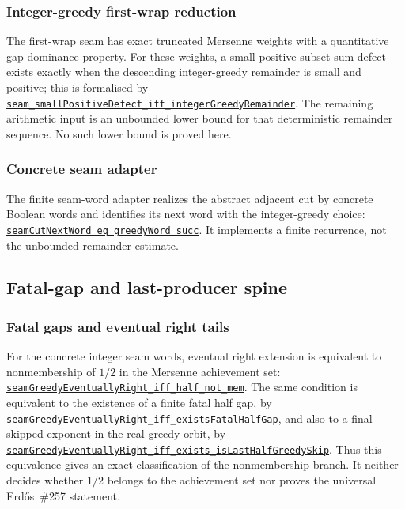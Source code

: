\documentclass[11pt]{article}
\newcommand{\commit}{81150c1c6fdd4cd51e76d3aa0de344341e0e9e7c}
\newcommand{\repobase}{https://github.com/wcook04/plectis-lean-erdos249-257/blob/\commit}
\newcommand{\PK}{Erdos249257}
\newcommand{\lref}[3]{\href{\repobase/\PK/#1\#L#2}{\nolinkurl{#3}}}
\newcommand{\lrefx}[3]{\href{\repobase/\PK/#1\#L#2}{\nolinkurl{#3}}}
\theoremstyle{definition}
\theoremstyle{remark}
\begin{document}
\subsubsection{Integer-greedy first-wrap reduction}\label{res:integergreedy}

The first-wrap seam has exact truncated Mersenne weights with a quantitative
gap-dominance property.  For these weights, a small positive subset-sum defect
exists exactly when the descending integer-greedy remainder is small and
positive; this is formalised by
\lref{HalfCylinderIntegerGreedy.lean}{654}{seam_smallPositiveDefect_iff_integerGreedyRemainder}.
The remaining arithmetic input is an unbounded lower bound for that
deterministic remainder sequence.  No such lower bound is proved here.

\subsubsection{Concrete seam adapter}\label{res:concreteseam}

The finite seam-word adapter realizes the abstract adjacent cut by concrete
Boolean words and identifies its next word with the integer-greedy choice:
\lref{HalfCylinderConcreteSeamAdapter.lean}{667}{seamCutNextWord_eq_greedyWord_succ}.
It implements a finite recurrence, not the unbounded remainder estimate.

\subsection{Fatal-gap and last-producer spine}

\subsubsection{Fatal gaps and eventual right tails}\label{res:fatalright}

For the concrete integer seam words, eventual right extension is equivalent
to nonmembership of $1/2$ in the Mersenne achievement set:
\lref{HalfCylinderFatalGapRightTail.lean}{787}{seamGreedyEventuallyRight_iff_half_not_mem}.
The same condition is equivalent to the existence of a finite fatal half gap,
by
\lrefx{HalfCylinderFatalGapRightTail.lean}{781}{seamGreedyEventuallyRight_iff_existsFatalHalfGap},
and also to a final skipped exponent in the real greedy orbit,
by
\lrefx{HalfCylinderFatalGapRightTail.lean}{802}{seamGreedyEventuallyRight_iff_exists_isLastHalfGreedySkip}.
Thus this equivalence gives an exact classification of the nonmembership branch.
It neither decides whether $1/2$ belongs to the achievement set nor proves
the universal Erd\H{o}s~\#257 statement.
\end{document}
